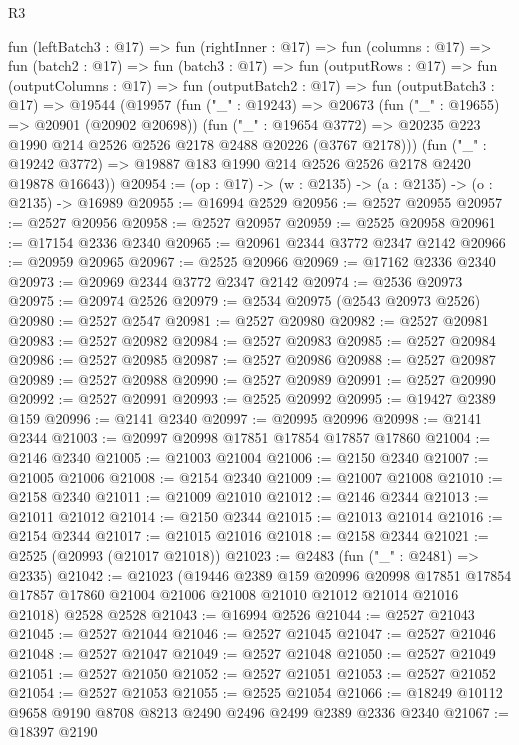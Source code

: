 \begin{lexlean}{R3}
\begin{coremodule}
  fun (leftBatch3 : @17) =>
  fun (rightInner : @17) =>
  fun (columns : @17) =>
  fun (batch2 : @17) =>
  fun (batch3 : @17) =>
  fun (outputRows : @17) =>
  fun (outputColumns : @17) =>
  fun (outputBatch2 : @17) =>
  fun (outputBatch3 : @17) =>
  @19544
    (@19957
      (fun ("_" : @19243) =>
      @20673
        (fun ("_" : @19655) => @20901 (@20902 @20698))
        (fun ("_" : @19654 @3772) =>
        @20235 @223 @1990 @214 @2526 @2526 @2178 @2488 @20226 (@3767 @2178)))
      (fun ("_" : @19242 @3772) => @19887 @183 @1990 @214 @2526 @2526 @2178 @2420 @19878 @16643))
@20954 := (op : @17) -> (w : @2135) -> (a : @2135) -> (o : @2135) -> @16989
@20955 := @16994 @2529
@20956 := @2527 @20955
@20957 := @2527 @20956
@20958 := @2527 @20957
@20959 := @2525 @20958
@20961 := @17154 @2336 @2340
@20965 := @20961 @2344 @3772 @2347 @2142
@20966 := @20959 @20965
@20967 := @2525 @20966
@20969 := @17162 @2336 @2340
@20973 := @20969 @2344 @3772 @2347 @2142
@20974 := @2536 @20973
@20975 := @20974 @2526
@20979 := @2534 @20975 (@2543 @20973 @2526)
@20980 := @2527 @2547
@20981 := @2527 @20980
@20982 := @2527 @20981
@20983 := @2527 @20982
@20984 := @2527 @20983
@20985 := @2527 @20984
@20986 := @2527 @20985
@20987 := @2527 @20986
@20988 := @2527 @20987
@20989 := @2527 @20988
@20990 := @2527 @20989
@20991 := @2527 @20990
@20992 := @2527 @20991
@20993 := @2525 @20992
@20995 := @19427 @2389 @159
@20996 := @2141 @2340
@20997 := @20995 @20996
@20998 := @2141 @2344
@21003 := @20997 @20998 @17851 @17854 @17857 @17860
@21004 := @2146 @2340
@21005 := @21003 @21004
@21006 := @2150 @2340
@21007 := @21005 @21006
@21008 := @2154 @2340
@21009 := @21007 @21008
@21010 := @2158 @2340
@21011 := @21009 @21010
@21012 := @2146 @2344
@21013 := @21011 @21012
@21014 := @2150 @2344
@21015 := @21013 @21014
@21016 := @2154 @2344
@21017 := @21015 @21016
@21018 := @2158 @2344
@21021 := @2525 (@20993 (@21017 @21018))
@21023 := @2483 (fun ("_" : @2481) => @2335)
@21042 := @21023
    (@19446
      @2389
      @159
      @20996
      @20998
      @17851
      @17854
      @17857
      @17860
      @21004
      @21006
      @21008
      @21010
      @21012
      @21014
      @21016
      @21018)
    @2528
    @2528
@21043 := @16994 @2526
@21044 := @2527 @21043
@21045 := @2527 @21044
@21046 := @2527 @21045
@21047 := @2527 @21046
@21048 := @2527 @21047
@21049 := @2527 @21048
@21050 := @2527 @21049
@21051 := @2527 @21050
@21052 := @2527 @21051
@21053 := @2527 @21052
@21054 := @2527 @21053
@21055 := @2525 @21054
@21066 := @18249 @10112 @9658 @9190 @8708 @8213 @2490 @2496 @2499 @2389 @2336 @2340
@21067 := @18397 @2190

\end{coremodule}
\end{lexlean}
